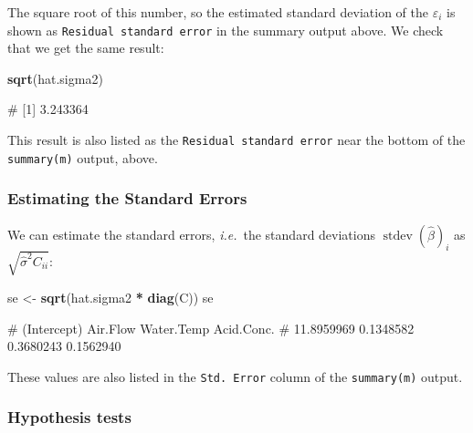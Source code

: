 \documentclass[
  a4paper,
]{article}
\newenvironment{Shaded}{\begin{snugshade}}{\end{snugshade}}
\newcommand{\FunctionTok}[1]{\textcolor[rgb]{0.13,0.29,0.53}{\textbf{#1}}}
\newcommand{\NormalTok}[1]{#1}
\newcommand{\OtherTok}[1]{\textcolor[rgb]{0.56,0.35,0.01}{#1}}
\newcommand{\SpecialCharTok}[1]{\textcolor[rgb]{0.81,0.36,0.00}{\textbf{#1}}}
\theoremstyle{definition}
\theoremstyle{definition}
\theoremstyle{definition}
\theoremstyle{definition}
\theoremstyle{remark}
\begin{document}
The square root of this number, so the estimated standard deviation of the
\(\varepsilon_i\) is shown as \texttt{Residual\ standard\ error} in the summary output above.
We check that we get the same result:

\begin{Shaded}
\begin{Highlighting}[]
\FunctionTok{sqrt}\NormalTok{(hat.sigma2)}
\end{Highlighting}
\end{Shaded}

\begin{Shaded}
\begin{Highlighting}[]
\NormalTok{\# [1] 3.243364}
\end{Highlighting}
\end{Shaded}

This result is also listed as the \texttt{Residual\ standard\ error} near the
bottom of the \texttt{summary(m)} output, above.

\subsubsection{Estimating the Standard Errors}\label{estimating-the-standard-errors}

We can estimate the standard errors, \emph{i.e.}~the standard deviations
\(\mathop{\mathrm{stdev}}(\hat\beta)_i\) as \(\sqrt{\hat\sigma^2 C_{ii}}\):

\begin{Shaded}
\begin{Highlighting}[]
\NormalTok{se }\OtherTok{\textless{}{-}} \FunctionTok{sqrt}\NormalTok{(hat.sigma2 }\SpecialCharTok{*} \FunctionTok{diag}\NormalTok{(C))}
\NormalTok{se}
\end{Highlighting}
\end{Shaded}

\begin{Shaded}
\begin{Highlighting}[]
\NormalTok{\# (Intercept)    Air.Flow  Water.Temp  Acid.Conc. }
\NormalTok{\#  11.8959969   0.1348582   0.3680243   0.1562940}
\end{Highlighting}
\end{Shaded}

These values are also listed in the \texttt{Std.\ Error} column of the \texttt{summary(m)}
output.

\subsubsection{Hypothesis tests}\label{hypothesis-tests-1}
\end{document}
